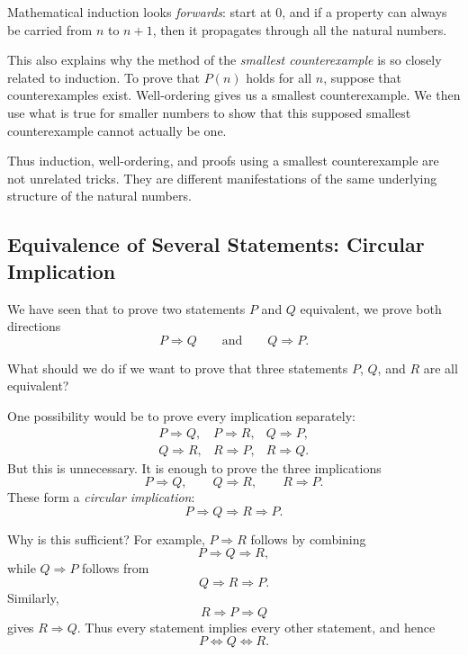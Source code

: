 Mathematical induction looks \emph{forwards}: start at $0$, and if a
property can always be carried from $n$ to $n+1$, then it propagates
through all the natural numbers.

This also explains why the method of the \emph{smallest counterexample}
is so closely related to induction. To prove that $P(n)$ holds for all
$n$, suppose that counterexamples exist. Well-ordering gives us a
smallest counterexample. We then use what is true for smaller numbers
to show that this supposed smallest counterexample cannot actually be
one.

Thus induction, well-ordering, and proofs using a smallest
counterexample are not unrelated tricks. They are different
manifestations of the same underlying structure of the natural numbers.


\subsection{Equivalence of Several Statements: Circular Implication}
\label{sec:circular-implication}

We have seen that to prove two statements $P$ and $Q$ equivalent, we
prove both directions
\[
        P\Longrightarrow Q
        \qquad\text{and}\qquad
        Q\Longrightarrow P.
\]

What should we do if we want to prove that three statements $P$, $Q$,
and $R$ are all equivalent?

One possibility would be to prove every implication separately:
\[
\begin{array}{ccc}
P\Rightarrow Q, & P\Rightarrow R, &
Q\Rightarrow P,\\
Q\Rightarrow R, & R\Rightarrow P, &
R\Rightarrow Q.
\end{array}
\]
But this is unnecessary. It is enough to prove the three implications
\[
        P\Longrightarrow Q,\qquad
        Q\Longrightarrow R,\qquad
        R\Longrightarrow P.
\]
These form a \emph{circular implication}:
\[
\boxed{
        P\Longrightarrow Q
        \Longrightarrow R
        \Longrightarrow P.
}
\]

Why is this sufficient? For example, $P\Rightarrow R$ follows by
combining
\[
        P\Rightarrow Q\Rightarrow R,
\]
while $Q\Rightarrow P$ follows from
\[
        Q\Rightarrow R\Rightarrow P.
\]
Similarly,
\[
        R\Rightarrow P\Rightarrow Q
\]
gives $R\Rightarrow Q$. Thus every statement implies every other
statement, and hence
\[
        P\Longleftrightarrow Q\Longleftrightarrow R.
\]

